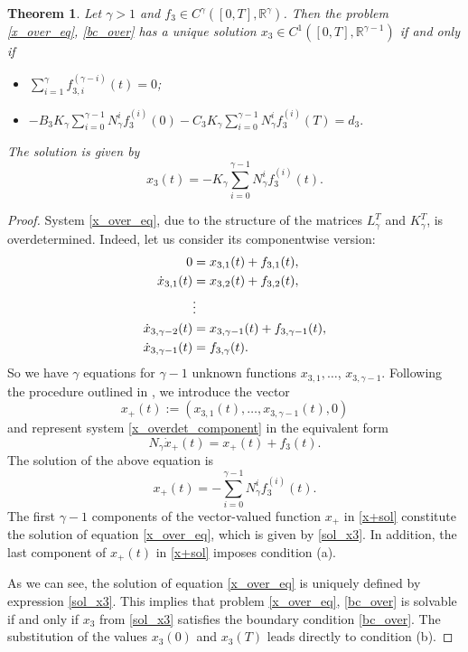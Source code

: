 \documentclass[preprint,12pt]{elsarticle}
\numberwithin{equation}{section}
\newtheorem{theorem}{Theorem}[section]
\theoremstyle{definition}
\begin{document}
\begin{theorem}\label{th_over_BVP}
    Let $\gamma>1$ and $f_3\in C^{\gamma}([0,T],\mathbb{R}^{\gamma})$. Then the problem \eqref{x_over_eq}, \eqref{bc_over} has a unique solution $x_3\in C^1([0,T],\mathbb{R}^{\gamma-1})$ if and only if
    \begin{itemize}
        \item[\emph{(a)}] $\sum\limits_{i=1}^{\gamma}f_{3,i}^{(\gamma-i)}(t)=0$;
         \item[\emph{(b)}]
         $-B_3 K_{\gamma}\sum\limits_{i=0}^{\gamma-1}N_{\gamma}^i f_3^{(i)}(0)-C_3K_{\gamma}\sum\limits_{i=0}^{\gamma-1}N_{\gamma}^i f_3^{(i)}(T)=d_3.$
        \end{itemize}

      The solution is given by \begin{equation}\label{sol_x3}
        x_3(t)=-K_{\gamma}\sum\limits_{i=0}^{\gamma-1}N_{\gamma}^i f_3^{(i)}(t).
    \end{equation}
\end{theorem}
\begin{proof}
    System \eqref{x_over_eq}, due to the structure of the matrices $L_{\gamma}^T$ and $K_{\gamma}^T$, is overdetermined. Indeed, let us consider its componentwise version:
\begin{align}\label{x_overdet_component}
0&=x_{3,1}(t)+f_{3,1}(t),\notag\\
\dot{x}_{3,1}(t)&=x_{3,2}(t)+f_{3,2}(t),\notag\\
&\vdots \\
\dot{x}_{3,\gamma-2}(t)&=x_{3,\gamma-1}(t)+f_{3,\gamma-1}(t),\notag\\
\dot{x}_{3,\gamma-1}(t)&=f_{3,\gamma}(t).\notag
\end{align}
So we have $\gamma$  equations for $\gamma-1$ unknown functions $x_{3,1},\ldots$, $x_{3,\gamma-1}$.
Following the procedure outlined in \cite{berger_diss}, we introduce the vector 
$$
x_+(t):=(x_{3,1}(t), \ldots, x_{3,\gamma-1}(t), 0)
$$
and represent system \eqref{x_overdet_component} in the equivalent form
\begin{equation*}
N_{\gamma}\dot{x}_+(t)=x_+(t)+f_3(t).
\end{equation*}
The solution of the above equation is
\begin{equation}\label{x+sol}
    x_+(t)=-\sum\limits_{i=0}^{\gamma-1} N_{\gamma}^i f_3^{(i)}(t).
\end{equation}
The first $\gamma-1$ components of the vector-valued function $x_+$ in \eqref{x+sol} constitute the solution of equation \eqref{x_over_eq}, which is given by \eqref{sol_x3}.
In addition, the last component of $x_+(t)$ in \eqref{x+sol} imposes  condition (a).

As we can see, the solution of equation \eqref{x_over_eq} is uniquely defined by expression \eqref{sol_x3}. This implies that problem \eqref{x_over_eq}, \eqref{bc_over} is solvable if and only if
$x_3$ from \eqref{sol_x3} satisfies the boundary condition \eqref{bc_over}.  The substitution of the values $x_3(0)$ and $x_3(T)$ leads directly to condition (b).
\end{proof}
\end{document}
